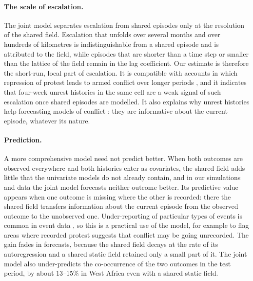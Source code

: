 \paragraph{The scale of escalation.} The joint model separates escalation from shared
episodes only at the resolution of the shared field. Escalation that unfolds over
several months and over hundreds of kilometres is indistinguishable from a shared
episode and is attributed to the field, while episodes that are shorter than a
time step or smaller than the lattice of the field remain in the lag coefficient. Our
estimate is therefore the short-run, local part of escalation. It is compatible with
accounts in which repression of protest leads to armed conflict over longer periods
\citep{ritter2016preventing, ryckman2020turn, chenoweth2017violent, rod2023protest},
and it indicates that four-week unrest histories in the same cell are a weak signal of
such escalation once shared episodes are modelled. It also explains why unrest
histories help forecasting models of conflict \citep{rod2025predicting}: they are
informative about the current episode, whatever its nature.

\paragraph{Prediction.} A more comprehensive model need not predict better. When both
outcomes are observed everywhere and both histories enter as covariates, the shared
field adds little that the univariate models do not already contain, and in our
simulations and data the joint model forecasts neither outcome better. Its predictive
value appears when one outcome is missing where the other is recorded: there the
shared field transfers information about the current episode from the observed
outcome to the unobserved one. Under-reporting of particular types of events is
common in event data \citep{weidmann2016closer, croicu2022reporting}, so this is a
practical use of the model, for example to flag areas where recorded protest
suggests that conflict may be going unrecorded. The gain fades in forecasts, because
the shared field decays at the rate of its autoregression and a shared static
field retained only a small part of it. The joint model also under-predicts the
co-occurrence of the two outcomes in the test period, by about 13--15\% in West
Africa even with a shared static field.

